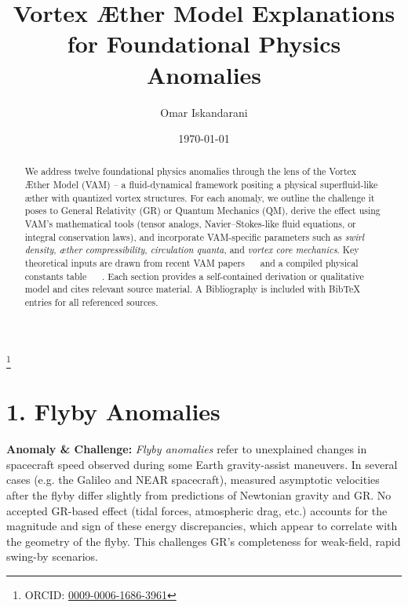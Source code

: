 \documentclass[a4paper, aps,preprint,superscriptaddress, 12pt]{revtex4}
\begin{document}
    \author{Omar Iskandarani}
    \title{Vortex Æther Model Explanations for Foundational Physics Anomalies}
    \date{\today}
    \thanks{ORCID: \href{https://orcid.org/0009-0006-1686-3961}{0009-0006-1686-3961}}


    \begin{abstract}
        We address twelve foundational physics anomalies through the lens of the Vortex Æther Model (VAM) – a fluid-dynamical framework positing a physical superfluid-like æther with quantized vortex structures. For each anomaly, we outline the challenge it poses to General Relativity (GR) or Quantum Mechanics (QM), derive the effect using VAM's mathematical tools (tensor analogs, Navier–Stokes-like fluid equations, or integral conservation laws), and incorporate VAM-specific parameters such as \textit{swirl density}, \textit{æther compressibility}, \textit{circulation quanta}, and \textit{vortex core mechanics}. Key theoretical inputs are drawn from recent VAM papers~\cite{Iskandarani2025a} ~\cite{Iskandarani2025c}  and a compiled physical constants table~\cite{VAM_constants} ~\cite{Iskandarani2025b} . Each section provides a self-contained derivation or qualitative model and cites relevant source material. A Bibliography is included with BibTeX entries for all referenced sources.

    \end{abstract}

  \maketitle


\section*{1. Flyby Anomalies}

\textbf{Anomaly \& Challenge: } \textit{Flyby anomalies} refer to unexplained changes in spacecraft speed observed during some Earth gravity-assist maneuvers. In several cases (e.g. the Galileo and NEAR spacecraft), measured asymptotic velocities after the flyby differ slightly from predictions of Newtonian gravity and GR. No accepted GR-based effect (tidal forces, atmospheric drag, etc.) accounts for the magnitude and sign of these energy discrepancies, which appear to correlate with the geometry of the flyby. This challenges GR's completeness for weak-field, rapid swing-by scenarios.
\end{document}
